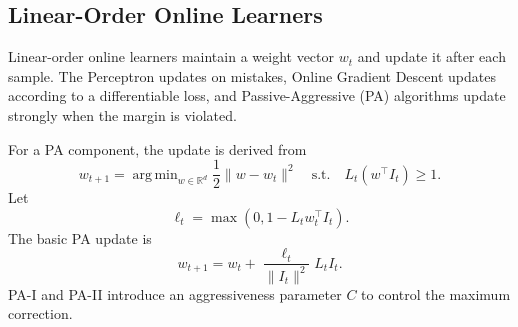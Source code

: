 ﻿\documentclass[12pt,a4paper]{article}
\DeclareMathOperator*{\argmin}{arg\,min}
\newcommand{\R}{\mathbb{R}}
\begin{document}
\subsection{Linear-Order Online Learners}
Linear-order online learners maintain a weight vector $w_t$ and update it
after each sample. The Perceptron updates on mistakes, Online Gradient
Descent updates according to a differentiable loss, and Passive-Aggressive
(PA) algorithms update strongly when the margin is violated.

For a PA component, the update is derived from
\begin{equation}
 w_{t+1}=\argmin_{w\in\R^d}\frac{1}{2}\|w-w_t\|^2
 \quad \text{s.t.}\quad L_t(w^\top I_t)\geq 1.
 \label{eq:pa_problem}
\end{equation}
Let
\begin{equation}
\ell_t=\max(0,1-L_t w_t^\top I_t).
\end{equation}
The basic PA update is
\begin{equation}
 w_{t+1}=w_t+\frac{\ell_t}{\|I_t\|^2}L_t I_t.
 \label{eq:pa_update_basic}
\end{equation}
PA-I and PA-II introduce an aggressiveness parameter $C$ to control the
maximum correction.

\begin{table}[H]
\centering
\caption{Linear-order online learning components and their drift behavior.}
\label{tab:linear_order}
\renewcommand{\arraystretch}{1.35}
\end{table}
\end{document}
